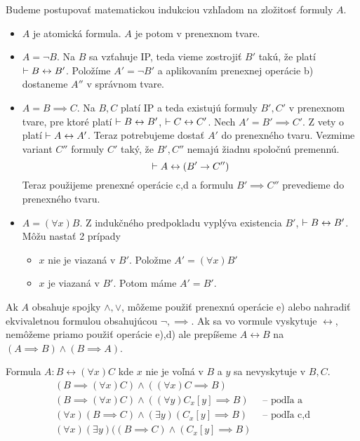 \begin{dokaz}
Budeme postupovať matematickou indukciou vzhľadom na zložitosť formuly $A$.
\begin{itemize}
    \item $A$ je atomická formula. $A$ je potom v prenexnom tvare.
    \item $A=\neg B$. Na $B$ sa vzťahuje IP, teda vieme zostrojiť
        $B'$ takú, že platí
        $\vdash B \leftrightarrow B'$.
        Položíme $A'=\neg B'$ a aplikovaním prenexnej operácie b) dostaneme 
        $A''$ v správnom tvare.
    \item $A=B \implies C$. Na $B,C$ platí IP a teda existujú formuly
        $B',C'$ v prenexnom tvare, pre ktoré platí
        $\vdash B \leftrightarrow B'$, $\vdash C \leftrightarrow C'$.
        Nech $A' = B' \implies C'$. Z vety o  platí
        $\vdash A \leftrightarrow A'$. Teraz potrebujeme dostať
        $A'$ do prenexného tvaru.
        Vezmime variant $C''$ formuly $C'$ taký, že $B',C''$ nemajú
        žiadnu spoločnú premennú.
        \begin{equation}
            \vdash A \leftrightarrow (B' \rightarrow C'')
        \end{equation}
        Teraz použijeme prenexné operácie c,d a formulu
        $B' \implies C''$ prevedieme do prenexného tvaru.
    \item $A=(\forall x)B$. Z indukčného predpokladu vyplýva
        existencia $B'$, $\vdash B \leftrightarrow B'$.
        Môžu nastať 2 prípady
        \begin{itemize}
        \item $x$ nie je viazaná v $B'$. Položme $A' = (\forall x) B'$
        \item $x$ je viazaná v $B'$. Potom máme $A' = B'$.
        \end{itemize}
\end{itemize}
\end{dokaz}
\begin{poznamka}
    Ak $A$ obsahuje spojky 
    $\land,\lor$, môžeme použiť prenexnú operácie e) alebo nahradiť
    ekvivaletnou formulou obsahujúcou $\neg,\implies$.
    Ak sa vo vormule vyskytuje $\leftrightarrow$, nemôžeme priamo
    použiť operácie e),d) ale prepíšeme $A\leftrightarrow B$ na
    $(A\implies B) \land (B \implies A)$.
\end{poznamka}

\begin{priklad}
    Formula $A: B \leftrightarrow (\forall x) C$ kde $x$ nie je voľná
    v $B$ a $y$ sa nevyskytuje v $B,C$.
    \begin{align*}
       (B \implies (\forall x) C) \land ((\forall x) C \implies B) &\\
       (B \implies (\forall x) C) \land ((\forall y) C_x[y] \implies B) 
       & \mbox{ -- podľa a} \\
       (\forall x)(B \implies C) \land (\exists y) (C_x[y] \implies B) 
       & \mbox{ -- podľa c,d} \\
       (\forall x)(\exists y)((B \implies C) \land (C_x[y] \implies B)
    \end{align*}
\end{priklad}

